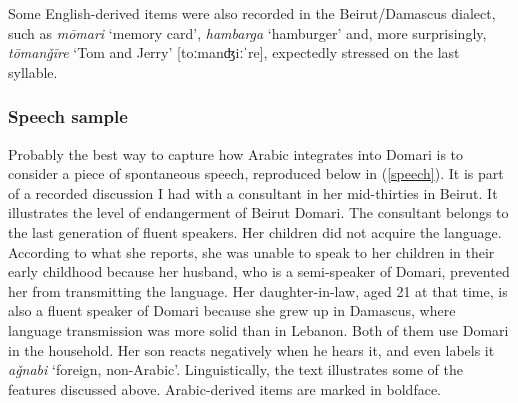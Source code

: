 \documentclass[output=paper]{langsci/langscibook}
\begin{document}
Some English-derived items were also recorded in the Beirut/Damascus dialect, such as \textit{mōmari} ‘memory card’, \textit{hambarga} ‘hamburger’ and, more surprisingly, \textit{tōman\v{g}īre} ‘Tom and Jerry’ [toːmanʤiːˈre], expectedly stressed on the last syllable.


 \subsubsection{Speech sample}

Probably the best way to capture how Arabic integrates into Domari is to consider a piece of spontaneous speech, reproduced below in (\ref{speech}). It is part of a recorded discussion I had with a consultant in her mid-thirties in Beirut. It illustrates the level of endangerment of Beirut Domari. The consultant belongs to the last generation of fluent speakers. Her children did not acquire the language. According to what she reports, she was unable to speak to her children in their early childhood because her husband, who is a semi-speaker of Domari, prevented her from transmitting the language. Her daughter-in-law, aged 21 at that time, is also a fluent speaker of Domari because she grew up in Damascus, where language transmission was more solid than in Lebanon. Both of them use Domari in the household. Her son reacts negatively when he hears it, and even labels it \textit{a\v{g}nabi} ‘foreign, non-Arabic’. Linguistically, the text illustrates some of the features discussed above. Arabic-derived items are marked in boldface. 
\end{document}
